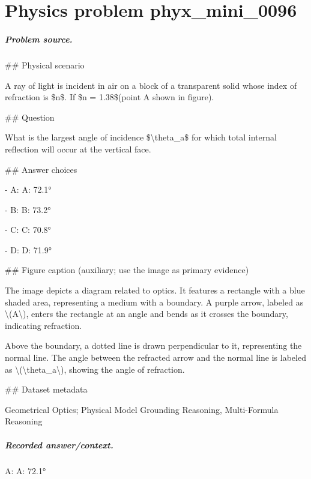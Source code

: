
\chapter{Physics problem phyx\_mini\_0096}
\label{ch:PhyXMiniProblems_problem_phyx_mini_0096}

\paragraph{Problem source.}
\#\# Physical scenario

A ray of light is incident in air on a block of a transparent solid whose index of refraction is \$n\$. If \$n = 1.38\$(point A shown in figure).

\#\# Question

What is the largest angle of incidence \$\textbackslash{}theta\_a\$ for which total internal reflection will occur at the vertical face.

\#\# Answer choices

- A: A: 72.1°

- B: B: 73.2°

- C: C: 70.8°

- D: D: 71.9°

\#\# Figure caption (auxiliary; use the image as primary evidence)

The image depicts a diagram related to optics. It features a rectangle with a blue shaded area, representing a medium with a boundary. A purple arrow, labeled as \textbackslash{}(A\textbackslash{}), enters the rectangle at an angle and bends as it crosses the boundary, indicating refraction. 

Above the boundary, a dotted line is drawn perpendicular to it, representing the normal line. The angle between the refracted arrow and the normal line is labeled as \textbackslash{}(\textbackslash{}theta\_a\textbackslash{}), showing the angle of refraction.

\#\# Dataset metadata

Geometrical Optics; Physical Model Grounding Reasoning, Multi-Formula Reasoning

\paragraph{Recorded answer/context.}
A: A: 72.1°

